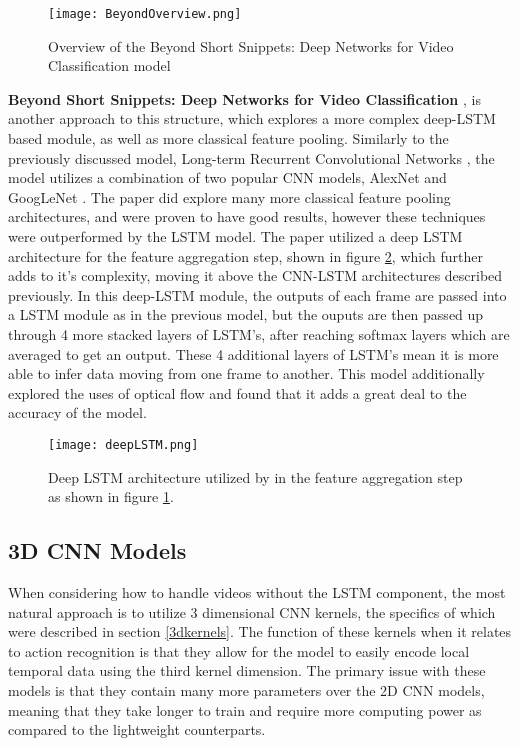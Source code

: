 \begin{figure}[h]
	\texttt{[image: BeyondOverview.png]}
	\centering
	\caption{Overview of the Beyond Short Snippets: Deep Networks for Video Classification model \cite{beyondshortsnippets}}
	\label{fig:beyondoverview}
\end{figure}

\textbf{Beyond Short Snippets: Deep Networks for Video Classification} \cite{beyondshortsnippets}, is another approach to this structure, which explores a more complex deep-LSTM based module, as well as more classical feature pooling. Similarly to the previously discussed model, Long-term Recurrent Convolutional Networks \cite{LRCNS}, the model utilizes a combination of two popular CNN models, AlexNet \cite{alexnet} and GoogLeNet \cite{googlenet}. The paper did explore many more classical feature pooling architectures, and were proven to have good results, however these techniques were outperformed by the LSTM model. The paper utilized a deep LSTM architecture for the feature aggregation step, shown in figure \ref{fig:deeplstm}, which further adds to it's complexity, moving it above the CNN-LSTM architectures described previously. In this deep-LSTM module, the outputs of each frame are passed into a LSTM module as in the previous model, but the ouputs are then passed up through 4 more stacked layers of LSTM's, after reaching softmax layers which are averaged to get an output. These 4 additional layers of LSTM's mean it is more able to infer data moving from one frame to another. This model additionally explored the uses of optical flow and found that it adds a great deal to the accuracy of the model.

\begin{figure}[h]
	\texttt{[image: deepLSTM.png]}
	\centering
	\caption{Deep LSTM architecture utilized by \cite{beyondshortsnippets} in the feature aggregation step as shown in figure \ref{fig:beyondoverview}.}
	\label{fig:deeplstm}
\end{figure}

\subsection{3D CNN Models}

When considering how to handle videos without the LSTM component, the most natural approach is to utilize 3 dimensional CNN kernels, the specifics of which were described in section \ref{3dkernels}. The function of these kernels when it relates to action recognition is that they allow for the model to easily encode local temporal data using the third kernel dimension. The primary issue with these models is that they contain many more parameters over the 2D CNN models, meaning that they take longer to train and require more computing power as compared to the lightweight counterparts.

